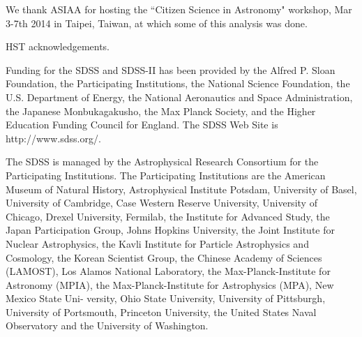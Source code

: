 \documentclass[usenatbib]{mn2e}
\begin{document}
We thank ASIAA for hosting the ``Citizen Science in Astronomy" workshop, Mar 3-7th 2014 in Taipei, Taiwan, at which some of this analysis was done. 

HST acknowledgements.

Funding for the SDSS and SDSS-II has been provided by the Alfred P. Sloan Foundation, the Participating Institutions, the National Science Foundation, the U.S. Department of Energy, the National Aeronautics and Space Administration, the Japanese Monbukagakusho, the Max Planck Society, and the Higher Education Funding Council for England. The SDSS Web Site is http://www.sdss.org/. 

The SDSS is managed by the Astrophysical Research Consortium for the Participating Institutions. The Participating Institutions are the American Museum of Natural History, Astrophysical  Institute Potsdam, University of Basel, University of Cambridge, 
Case Western Reserve University, University of Chicago, Drexel University, Fermilab, the Institute for Advanced Study, the Japan 
Participation Group, Johns Hopkins University, the Joint Institute for Nuclear Astrophysics, the Kavli Institute for Particle Astrophysics and Cosmology, the Korean Scientist Group, the Chinese Academy of Sciences (LAMOST), Los Alamos National Laboratory, the Max-Planck-Institute for Astronomy (MPIA), the Max-Planck-Institute for Astrophysics (MPA), New Mexico State Uni- 
versity, Ohio State University, University of Pittsburgh, University of Portsmouth, Princeton University, the United States Naval Observatory and the University of Washington. 


\begin{thebibliography}{}

\end{thebibliography}
\end{document}
